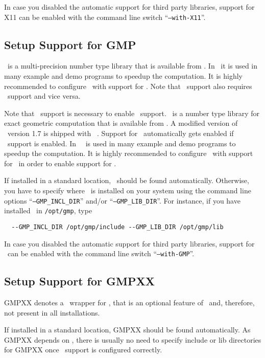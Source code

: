 In case you disabled the automatic support for third party libraries,
support for X11 can be enabled with the command line switch
``\texttt{--with-X11}''.

\subsection{Setup Support for GMP\label{sec:gmp-setup}}

\gmp\ is a multi-precision number type library that is available from
\gmppage. In \cgal\ it is used in many example and demo programs to
speedup the computation. It is highly recommended to configure \cgal\
with support for \gmp. Note that \gmp\ support also requires \mpfr\
support and vice versa.

Note that \gmp\ support is necessary to enable \core\ support.
\core\ is a number type library for exact geometric computation that
is available from \corepage. A modified version of \core\ version 1.7
is shipped with \cgal~\cgalrelease. Support for \core\ automatically
gets enabled if \gmp\ support is enabled. In \cgal\, \core\ is used
in many example and demo programs to speedup the computation. It is
highly recommended to configure \cgal\ with support for \gmp\ in order
to enable support for \core.

If installed in a standard location, \gmp\ should be
found automatically. Otherwise, you have to specify where \gmp\ is
installed on your system using the command line options
``\texttt{--GMP\_INCL\_DIR}'' and/or ``\texttt{--GMP\_LIB\_DIR}''. For
instance, if you have installed \gmp\ in \texttt{/opt/gmp}, type
\begin{verbatim}
  --GMP_INCL_DIR /opt/gmp/include --GMP_LIB_DIR /opt/gmp/lib
\end{verbatim}

In case you disabled the automatic support for third party libraries,
support for \gmp\ can be enabled with the command line switch
``\texttt{--with-GMP}''.

\subsection{Setup Support for GMPXX\label{sec:gmpxx-setup}}

GMPXX denotes a \CC\ wrapper for \gmp, that is an optional feature of
\gmp\ and, therefore, not present in all installations.

If installed in a standard location, GMPXX should be found
automatically. As GMPXX depends on \gmp, there is usually no need to
specify include or lib directories for GMPXX once \gmp\ support is
configured correctly.

